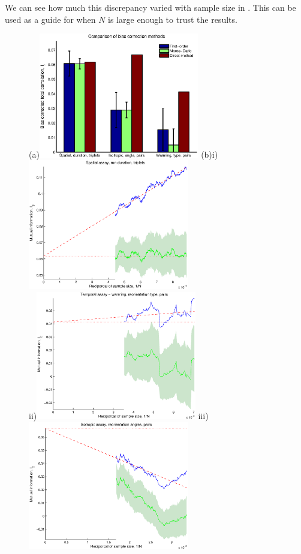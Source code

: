 \documentclass[12pt]{article}
\begin{document}
We can see how much this discrepancy varied with sample size in . This can be used as a guide for when $N$ is large enough to trust the results.


\begin{figure}
  \begin{center}
    (a)\includegraphics[width=7cm]{comparison.eps}
    (b)i)\includegraphics[width=7cm]{spat_dur_3.eps}\\
    ii)\includegraphics[width=7cm]{warm_typ_2.eps}
    iii)\includegraphics[width=7cm]{iso_ang_2.eps}

\end{center}
\end{figure}
\end{document}

